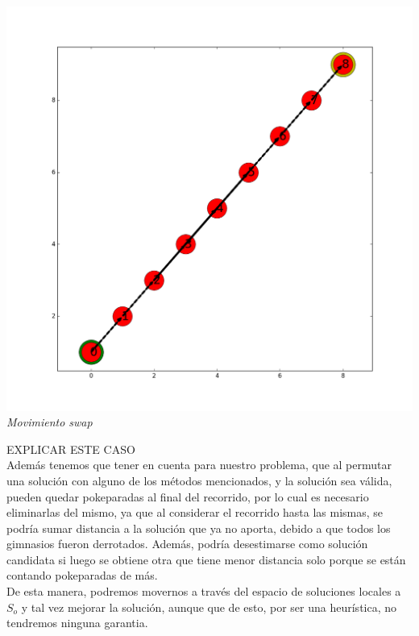\vspace*{0.3cm} \vspace*{0.3cm}
  \begin{center}
 \includegraphics[scale=0.3]{./EJ3/ejemploSwap.png}\\
 {            \textit{Movimiento swap}}
  \end{center}
  \vspace*{0.3cm}

  EXPLICAR ESTE CASO\\

Además tenemos que tener en cuenta para nuestro problema, que al permutar una solución con alguno de los métodos mencionados, y la solución sea válida, pueden quedar pokeparadas al final del recorrido, por lo cual es necesario eliminarlas del mismo, ya que al considerar el recorrido hasta las mismas, se podría sumar distancia a la solución que ya no aporta, debido a que todos los gimnasios fueron derrotados. Además, podría desestimarse como solución candidata si luego se obtiene otra que tiene menor distancia solo porque se están contando pokeparadas de más.\\

De esta manera, podremos movernos a través del espacio de soluciones locales a $S_o$ y tal vez mejorar la solución, aunque que de esto, por ser una heurística, no tendremos ninguna garantia.

